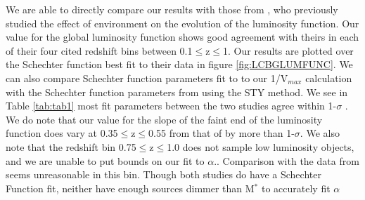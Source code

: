 \documentclass[manuscript]{aastex61}
\begin{document}
We are able to directly compare our results with those from \citet{2009A&A...508.1217Z}, who previously studied the effect of environment on the evolution of the luminosity function. Our value for the global luminosity function shows good agreement with theirs in each of their four cited redshift bins between 0.1$\leq$z$\leq$1. Our results are plotted over the Schechter function best fit to their data in figure \ref{fig:LCBGLUMFUNC}. We can also compare Schechter function parameters fit to to our 1/V$_{max}$ calculation with the Schechter function parameters from \citet{2009A&A...508.1217Z} using the STY method. We see in Table \ref{tab:tab1} most fit parameters between the two studies agree within 1-$\sigma$ . We do note that our value for the slope of the faint end of the luminosity function does vary at 0.35$\leq$z$\leq$0.55 from that of \citet{2009A&A...508.1217Z} by more than 1-$\sigma$. We also note that the redshift bin 0.75$\leq$z$\leq$1.0 does not sample low luminosity objects, and we are unable to put bounds on our fit to $\alpha$.. Comparison with the data from \citet{2009A&A...508.1217Z} seems unreasonable in this bin. Though both studies do have a Schechter Function fit, neither have enough sources dimmer than M$^{*}$ to accurately fit $\alpha$
\end{document}
